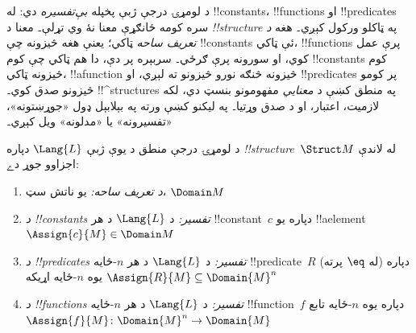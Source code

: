 \documentclass[../../../include/open-logic-section]{subfiles}
\begin{document}


\begin{explain}
د لومړۍ درجې ژبې پخپله \emph{بې‌تفسيره} دي: له !!{constant}s،
!!{function}s او !!{predicate}s سره کومه ځانګړې معنا نۀ وي تړلې۔
معنا د  \emph{!!{structure}} په ټاکلو ورکول کېږي۔
هغه \emph{د تعريف ساحه} ټاکي؛ يعنې هغه څيزونه چې !!{constant}s ئې
ټاکي، !!{function}s پرې عمل کوي، او سورونه پرې ګرځي۔ سربېره پر دې،
دا هم ټاکي چې کوم !!{constant}s کوم څيزونه ټاکي، !!a{function}
څيزونه څنګه نورو څيزونو ته لېږي، او !!{predicate}s پر کومو څيزونو
صدق کوي۔ !!^{structure}s په منطق کښې د \emph{معنايي} مفهومونو بنسټ
دي، لکه لازميت، اعتبار، او د صدق وړتيا۔ په ليکنو کښې ورته په بېلابېل
ډول «جوړښتونه»، «تفسيرونه» يا «مدلونه» ويل کېږي۔
\end{explain}

\begin{defn}[!!^{structure}s]
د لومړۍ درجې منطق د يوې ژبې $\Lang{L}$ دپاره 
\emph{!!{structure}}~$\Struct M$ له لاندې اجزاوو جوړ دے:
\begin{enumerate}
\item \emph{د تعريف ساحه:} يو ناتش سټ، $\Domain M$
\item \emph{د !!{constant}s تفسير:} د $\Lang{L}$ د هر
  !!{constant}~$c$ دپاره يو !!a{element} $\Assign{c}{M} \in \Domain M$
\item \emph{د !!{predicate}s تفسير:} د $\Lang{L}$ د هر $n$-ځايه
  !!{predicate}~$R$ دپاره (له $\eq$ پرته) يوه $n$-ځايه اړيکه
  $\Assign{R}{M} \subseteq \Domain{M}^n$
\item \emph{د !!{function}s تفسير:} د $\Lang{L}$ د هر $n$-ځايه
  !!{function}~$f$ دپاره يوه $n$-ځايه تابع $\Assign{f}{M}
  \colon \Domain{M}^n \to \Domain{M}$
\end{enumerate}
\end{defn}
\end{document}
